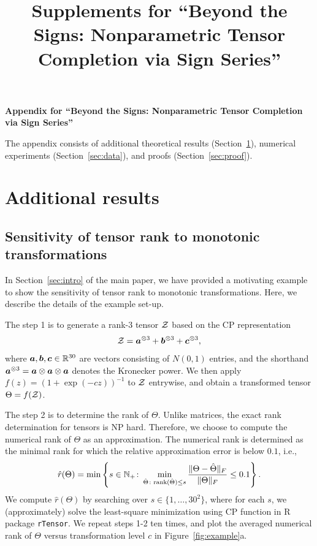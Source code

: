 \documentclass[11pt]{article}
\title{Supplements for ``Beyond the Signs: Nonparametric Tensor Completion via Sign Series''}
\theoremstyle{plain}
\theoremstyle{definition}
\def\rank{\textup{rank}}
\begin{document}
\begin{center}
\begin{spacing}{1.5}
\textbf{\Large Appendix for ``Beyond the Signs: Nonparametric Tensor Completion via Sign Series''}
\end{spacing}
\end{center}

\appendix
The appendix consists of additional theoretical results (Section~\ref{sec:additional}), numerical experiments (Section~\ref{sec:data}), and proofs (Section~\ref{sec:proof}). 

\section{Additional results}\label{sec:additional}
\subsection{Sensitivity of tensor rank to monotonic transformations}
In Section~\ref{sec:intro} of the main paper, we have provided a motivating example to show the sensitivity of tensor rank to monotonic transformations. Here, we describe the details of the example set-up. 

The step 1 is to generate a rank-3 tensor $\mathcal{Z}$ based on the CP representation
\[
\mathcal{Z}=\bm{a}^{\otimes 3}+\bm{b}^{\otimes 3}+\bm{c}^{\otimes 3},
\]
where $\bm{a},\bm{b},\bm{c}\in\mathbb{R}^{30}$ are vectors consisting of $N(0,1)$ entries, and the shorthand $\bm{a}^{\otimes 3}=\bm{a}\otimes \bm{a}\otimes \bm{a}$ denotes the Kronecker power. We then apply $f(z)=(1+\exp(-cz))^{-1}$ to $\mathcal{Z}$ entrywise, and obtain a transformed tensor $\Theta=f(\mathcal{Z})$. 

The step 2 is to determine the rank of $\Theta$. Unlike matrices, the exact rank determination for tensors is NP hard. Therefore, we choose to compute the numerical rank of $\Theta$ as an approximation.  The numerical rank is determined as the minimal rank for which the relative approximation error is below $0.1$, i.e.,
\begin{equation}\label{eq:numeric}
 \hat r(\Theta)=\min\left\{s\in\mathbb{N}_{+}\colon \min_{\hat \Theta\colon \rank(\hat \Theta)\leq s}{\FnormSize{}{\Theta-\hat \Theta}\over \FnormSize{}{\Theta}} \leq 0.1\right\}.
\end{equation}
We compute $\hat r(\Theta)$ by searching over $s\in\{1,\ldots,30^2\}$, where for each $s$, we (approximately) solve the least-square minimization using CP function in R package {\tt rTensor}. 
We repeat steps 1-2 ten times, and plot the averaged numerical rank of $\Theta$ versus transformation level $c$ in Figure~\ref{fig:example}a.  
\end{document}
